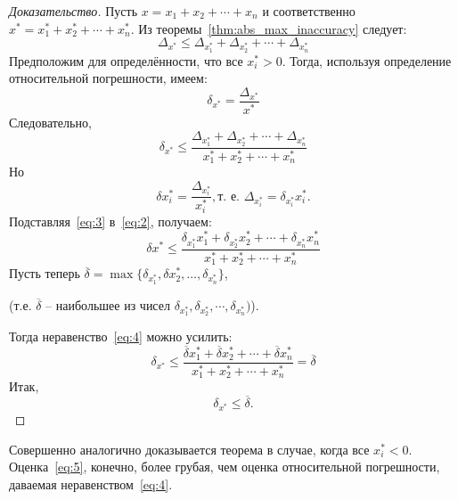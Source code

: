 \begin{proof}[Доказательство]
	Пусть $x = x_1 + x_2 + \cdots + x_n$ и соответственно $x^* = x^*_1 +
	x^*_2 + \cdots + x^*_n$. Из теоремы~\ref{thm:abs_max_inaccuracy}
	следует:
	$$\Delta_{x^*} \leq \Delta_{x^*_1} + \Delta_{x^*_2} + \cdots +
	\Delta_{x^*_n}$$
	Предположим для определённости, что все $x^*_i > 0$. Тогда, используя
	определение относительной погрешности, имеем:
	$$\delta_{x^*} = \frac{\Delta_{x^*}}{x^*}$$
	Следовательно,
	\begin{equation}
		\delta_{x^*} \leq \frac{\Delta_{x^*_1} + \Delta_{x^*_2} + \cdots
		+ \Delta_{x^*_n}}{x^*_1 + x^*_2 + \cdots + x^*_n}
		\label{eq:2}
	\end{equation}
	Но
	\begin{equation}
		\delta{x^*_i} = \frac{\Delta_{x^*_i}}{x^*_i}, \text{т. е.
		$\Delta_{x^*_i} = \delta_{x^*_i} x^*_i$}.
		\label{eq:3}
	\end{equation}
	Подставляя~\ref{eq:3} в~\ref{eq:2}, получаем:
	\begin{equation}
		\delta{x^*} \leq \frac{\delta_{x^*_1} x^*_1 +
			\delta_{x^*_2} x^*_2 + \cdots + \delta_{x^*_n}
		x^*_n}{x^*_1 + x^*_2 + \cdots + x^*_n}
		\label{eq:4}
	\end{equation}
	Пусть теперь $\overline{\delta} = \max \{\delta_{x^*_1}, \delta{x^*_2},
	\ldots, \delta_{x^*_n}\}$,

	(т.е. $\overline{\delta}$ -- наибольшее из чисел $\delta_{x^*_1},
	\delta_{x^*_2}, \cdots, \delta_{x^*_n})$).

	Тогда неравенство~\ref{eq:4} можно усилить:
	$$\delta_{x^*} \leq \frac{\overline{\delta} x^*_1 +
		\overline{\delta} x^*_2 + \cdots + \overline{\delta}
	x^*_n}{x^*_1 + x^*_2 + \cdots + x^*_n} = \overline{\delta}$$
	Итак,
	\begin{equation}
		\delta_{x^*} \leq \overline{\delta}.
		\label{eq:5}
	\end{equation}
\end{proof}
Совершенно аналогично доказывается теорема в случае, когда все $x^*_i < 0$.
Оценка~\ref{eq:5}, конечно, более грубая, чем оценка относительной погрешности,
даваемая неравенством~\ref{eq:4}.
